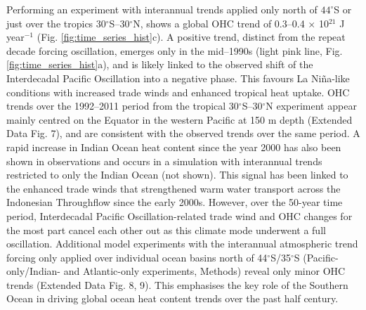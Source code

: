\documentclass{nature}
\begin{document}
	Performing an experiment with interannual trends applied only north of $44^{\circ}$S or just over the tropics 30$^{\circ}$S--30$^{\circ}$N, shows a global OHC trend of 0.3--0.4 $\times$ 10$^{21}$ J year$^{-1}$ (Fig. \ref{fig:time_series_hist}c). A positive trend, distinct from the repeat decade forcing oscillation, emerges only in the mid--1990s (light pink line, Fig. \ref{fig:time_series_hist}a), and is likely linked to the observed shift of the Interdecadal Pacific Oscillation into a negative phase. This favours La Ni\~na-like conditions with increased trade winds and enhanced tropical heat uptake\cite{england2014recent,henley2017IPO}. OHC trends over the 1992--2011 period from the tropical 30$^{\circ}$S--30$^{\circ}$N experiment appear mainly centred on the Equator in the western Pacific at 150 m depth (Extended Data Fig. 7), and are consistent with the observed trends over the same period\cite{england2014recent}. A rapid increase in Indian Ocean heat content since the year 2000 has also been shown in observations\cite{Lee2015hiatus} and occurs in a simulation with interannual trends restricted to only the Indian Ocean (not shown). This signal has been linked to the enhanced trade winds that strengthened warm water transport across the Indonesian Throughflow since the early 2000s\cite{Lee2015hiatus, maher2017role}. However, over the 50-year time period, Interdecadal Pacific Oscillation-related trade wind and OHC changes for the most part cancel each other out as this climate mode underwent a full oscillation\cite{england2014recent,meehl2016prediction}. Additional model experiments with the interannual atmospheric trend forcing only applied over individual ocean basins north of 44$^{\circ}$S/35$^{\circ}$S (Pacific-only/Indian- and Atlantic-only experiments, Methods) reveal only minor OHC trends (Extended Data Fig. 8, 9).  This emphasises the key role of the Southern Ocean in driving global ocean heat content trends over the past half century.
	
	
\end{document}

